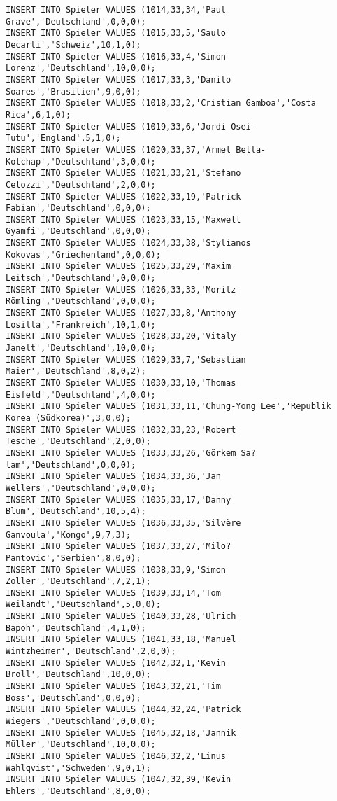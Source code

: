 \documentclass{lehramt-informatik-aufgabe}
\begin{document}
\begin{verbatim}
INSERT INTO Spieler VALUES (1014,33,34,'Paul Grave','Deutschland',0,0,0);
INSERT INTO Spieler VALUES (1015,33,5,'Saulo Decarli','Schweiz',10,1,0);
INSERT INTO Spieler VALUES (1016,33,4,'Simon Lorenz','Deutschland',10,0,0);
INSERT INTO Spieler VALUES (1017,33,3,'Danilo Soares','Brasilien',9,0,0);
INSERT INTO Spieler VALUES (1018,33,2,'Cristian Gamboa','Costa Rica',6,1,0);
INSERT INTO Spieler VALUES (1019,33,6,'Jordi Osei-Tutu','England',5,1,0);
INSERT INTO Spieler VALUES (1020,33,37,'Armel Bella-Kotchap','Deutschland',3,0,0);
INSERT INTO Spieler VALUES (1021,33,21,'Stefano Celozzi','Deutschland',2,0,0);
INSERT INTO Spieler VALUES (1022,33,19,'Patrick Fabian','Deutschland',0,0,0);
INSERT INTO Spieler VALUES (1023,33,15,'Maxwell Gyamfi','Deutschland',0,0,0);
INSERT INTO Spieler VALUES (1024,33,38,'Stylianos Kokovas','Griechenland',0,0,0);
INSERT INTO Spieler VALUES (1025,33,29,'Maxim Leitsch','Deutschland',0,0,0);
INSERT INTO Spieler VALUES (1026,33,33,'Moritz Römling','Deutschland',0,0,0);
INSERT INTO Spieler VALUES (1027,33,8,'Anthony Losilla','Frankreich',10,1,0);
INSERT INTO Spieler VALUES (1028,33,20,'Vitaly Janelt','Deutschland',10,0,0);
INSERT INTO Spieler VALUES (1029,33,7,'Sebastian Maier','Deutschland',8,0,2);
INSERT INTO Spieler VALUES (1030,33,10,'Thomas Eisfeld','Deutschland',4,0,0);
INSERT INTO Spieler VALUES (1031,33,11,'Chung-Yong Lee','Republik Korea (Südkorea)',3,0,0);
INSERT INTO Spieler VALUES (1032,33,23,'Robert Tesche','Deutschland',2,0,0);
INSERT INTO Spieler VALUES (1033,33,26,'Görkem Sa?lam','Deutschland',0,0,0);
INSERT INTO Spieler VALUES (1034,33,36,'Jan Wellers','Deutschland',0,0,0);
INSERT INTO Spieler VALUES (1035,33,17,'Danny Blum','Deutschland',10,5,4);
INSERT INTO Spieler VALUES (1036,33,35,'Silvère Ganvoula','Kongo',9,7,3);
INSERT INTO Spieler VALUES (1037,33,27,'Milo? Pantovic','Serbien',8,0,0);
INSERT INTO Spieler VALUES (1038,33,9,'Simon Zoller','Deutschland',7,2,1);
INSERT INTO Spieler VALUES (1039,33,14,'Tom Weilandt','Deutschland',5,0,0);
INSERT INTO Spieler VALUES (1040,33,28,'Ulrich Bapoh','Deutschland',4,1,0);
INSERT INTO Spieler VALUES (1041,33,18,'Manuel Wintzheimer','Deutschland',2,0,0);
INSERT INTO Spieler VALUES (1042,32,1,'Kevin Broll','Deutschland',10,0,0);
INSERT INTO Spieler VALUES (1043,32,21,'Tim Boss','Deutschland',0,0,0);
INSERT INTO Spieler VALUES (1044,32,24,'Patrick Wiegers','Deutschland',0,0,0);
INSERT INTO Spieler VALUES (1045,32,18,'Jannik Müller','Deutschland',10,0,0);
INSERT INTO Spieler VALUES (1046,32,2,'Linus Wahlqvist','Schweden',9,0,1);
INSERT INTO Spieler VALUES (1047,32,39,'Kevin Ehlers','Deutschland',8,0,0);

\end{verbatim}
\end{document}
